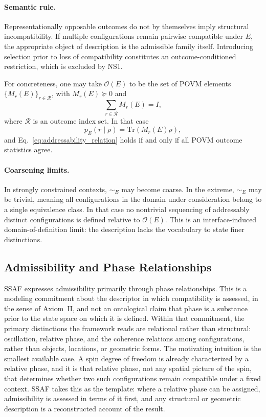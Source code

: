 \documentclass[aps,prx,onecolumn,11pt]{revtex4-2}
\theoremstyle{plain}
\theoremstyle{definition}
\theoremstyle{remark}
\begin{document}
\paragraph{Semantic rule.}
Representationally opposable outcomes do not by themselves imply
structural incompatibility. If multiple configurations remain pairwise
compatible under \(E\), the appropriate object of description is the
admissible family itself. Introducing selection prior to loss of
compatibility constitutes an outcome-conditioned restriction, which is
excluded by NS1.

For concreteness, one may take \(\mathcal O(E)\) to be the set of POVM
elements \(\{M_r(E)\}_{r\in\mathcal R}\), with
\(M_r(E)\succeq 0\) and
\[
\sum_{r\in\mathcal R}M_r(E)=I,
\]
where \(\mathcal R\) is an outcome index set. In that case
\[
p_E(r\mid\rho)=\mathrm{Tr}(M_r(E)\rho),
\]
and Eq.~\eqref{eq:addressability_relation} holds if and only if all
POVM outcome statistics agree.

\paragraph{Coarsening limits.}
In strongly constrained contexts, \(\sim_E\) may become coarse. In the
extreme, \(\sim_E\) may be trivial, meaning all configurations in the
domain under consideration belong to a single equivalence class. In
that case no nontrivial sequencing of addressably distinct
configurations is defined relative to \(\mathcal O(E)\). This is an
interface-induced domain-of-definition limit: the description lacks the
vocabulary to state finer distinctions.

\subsection{Admissibility and Phase Relationships}
\label{subsec:admissibility_phase_relationships}

SSAF expresses admissibility primarily through phase relationships. This
is a modeling commitment about the descriptor in which compatibility is
assessed, in the sense of Axiom~II, and not an ontological claim that
phase is a substance prior to the state space on which it is defined.
Within that commitment, the primary distinctions the framework reads are
relational rather than structural: oscillation, relative phase, and the
coherence relations among configurations, rather than objects,
locations, or geometric forms. The motivating intuition is the smallest
available case. A spin degree of freedom is already characterized by a
relative phase, and it is that relative phase, not any spatial picture of
the spin, that determines whether two such configurations remain
compatible under a fixed context. SSAF takes this as the template: where
a relative phase can be assigned, admissibility is assessed in terms of
it first, and any structural or geometric description is a reconstructed
account of the result.
\end{document}
